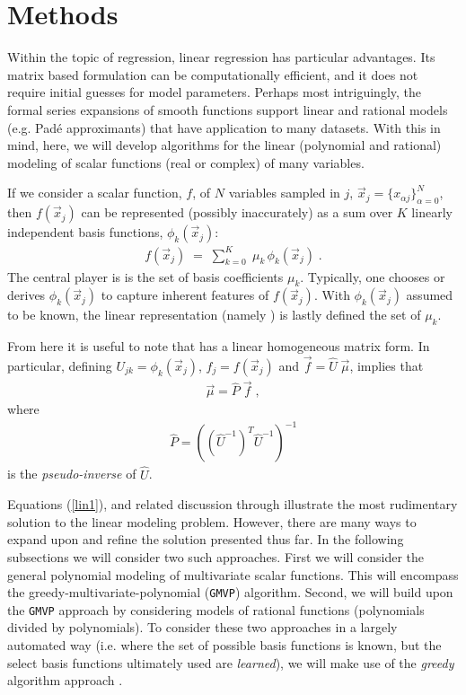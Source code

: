 \documentclass[twocolumn,aps,prd,floatfix,preprintnumbers,a4paper,nofootinbib,
superscriptaddress,10pt]{revtex4-1}
\def\gmvp#1{greedy-multivariate-polynomial#1
  (\texttt{GMVP}#1)\gdef\gmvp{\texttt{GMVP}}}
\begin{document}
\section{Methods}
\label{meth}
%
Within the topic of regression, linear regression has particular advantages.
%
Its matrix based formulation can be computationally efficient, and it does not require initial guesses for model parameters.
%
Perhaps most intriguingly, the formal series expansions of smooth functions support linear and rational models (e.g. Pad\'e approximants) that have application to many datasets.
%
With this in mind, here, we will develop algorithms for the linear (polynomial and rational) modeling of scalar functions (real or complex) of many variables.
%
\par If we consider a scalar function, $f$, of $N$ variables sampled in $j$, $\vec{x}_j = \{x_{\alpha j}\}_{\alpha=0}^{N}$, then $f(\vec{x}_j)$ can be represented (possibly inaccurately) as a sum over $K$ linearly independent basis functions, $\phi_k(\vec{x}_j)$:
%
\begin{align}
  \label{lin1}
  f({\vec{x}}_j) \; = \; \sum_{k=0}^{K} \; \mu_{k} \, \phi_k(\vec{x}_j)\; .
\end{align}
%
The central player is  is the set of basis coefficients $\mu_{k}$.
%
Typically, one chooses or derives $\phi_{k}(\vec{x}_j)$ to capture inherent features of $f(\vec{x}_j)$.
%
With $\phi_{k}(\vec{x}_j)$ assumed to be known, the linear representation (namely ) is lastly defined the set of $\mu_k$.
%
\def\vecmu{\vec{\mu}}
\def\vecf{\vec{f}}
\def\hatU{\hat{U}}
\def\hatP{\hat{P}}
%
\par From here it is useful to note that  has a linear homogeneous matrix form.
%
In particular, defining ${U}_{jk} = \phi_k(\vec{x}_j)$, $f_j = f(\vec{x}_j)$ and $\vec{f} = \hat{U} \; \vec{\mu}$, implies that
%
\begin{align}
  \label{eq:linsol1}
  \vecmu = \hatP \; \vecf \; ,
\end{align}
%
where
%
\begin{align}
  \label{pinv1}
  \hatP = \left( \left( \hatU^{-1} \right)^T \hatU^{-1} \right)^{-1}
\end{align}
%
is the \textit{pseudo-inverse} \cite{Moore1920,Penrose:1955} of $\hatU$.
%
\par Equations (\ref{lin1}), and related discussion through  illustrate the most rudimentary solution to the linear modeling problem.
%
However, there are many ways to expand upon and refine the solution presented thus far.
%
In the following subsections we will consider two such approaches.
%
First we will consider the general polynomial modeling of multivariate scalar functions.
%
This will encompass the \gmvp{} algorithm.
%
Second, we will build upon the \gmvp{} approach by considering models of rational functions (polynomials divided by polynomials).
%
To consider these two approaches in a largely automated way (i.e. where the set of possible basis functions is known, but the select basis functions ultimately used are \textit{learned}), we will make use of the \textit{greedy} algorithm approach \cite{Field:2011mf}.
%
\end{document}
